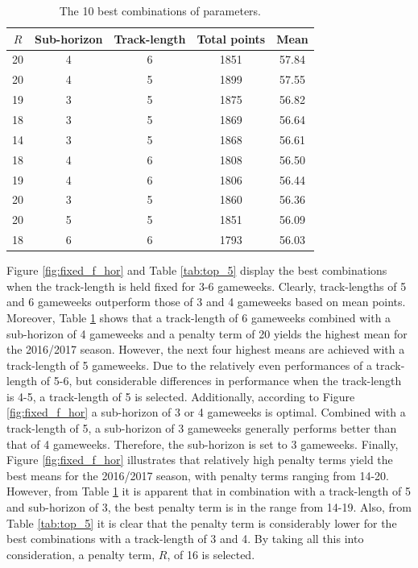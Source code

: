 \begin{table}[H]
\centering
\begin{tabular}{|c|c|c|c|c|}
\hline
$R$ & Sub-horizon & Track-length & Total points & Mean  \\
\hline
20      & 4       & 6                & 1851         & 57.84 \\
20      & 4       & 5                & 1899         & 57.55 \\
19      & 3       & 5                & 1875         & 56.82 \\
18      & 3       & 5                & 1869         & 56.64 \\
14      & 3       & 5                & 1868         & 56.61 \\
18      & 4       & 6                & 1808         & 56.50 \\
19      & 4       & 6                & 1806         & 56.44 \\
20      & 3       & 5                & 1860         & 56.36 \\
20      & 5       & 5                & 1851         & 56.09 \\
18      & 6       & 6                & 1793         & 56.03 \\
\hline
\end{tabular}
\caption{The 10 best combinations of parameters.}
\label{tab:top_10}
\end{table}


Figure \ref{fig:fixed_f_hor} and Table \ref{tab:top_5} display the best combinations when the track-length is held fixed for 3-6 gameweeks. Clearly, track-lengths of 5 and 6 gameweeks outperform those of 3 and 4 gameweeks based on mean points. Moreover, Table \ref{tab:top_10} shows that a track-length of 6 gameweeks combined with a sub-horizon of 4 gameweeks and a penalty term of 20 yields the highest mean for the 2016/2017 season. However, the next four highest means are achieved with a track-length of 5 gameweeks. Due to the relatively even performances of a track-length of 5-6, but considerable differences in performance when the track-length is 4-5, a track-length of 5 is selected. Additionally, according to Figure \ref{fig:fixed_f_hor} a sub-horizon of 3 or 4 gameweeks is optimal. Combined with a track-length of 5, a sub-horizon of 3 gameweeks generally performs better than that of 4 gameweeks. Therefore, the sub-horizon is set to 3 gameweeks. Finally, Figure \ref{fig:fixed_f_hor} illustrates that relatively high penalty terms yield the best means for the 2016/2017 season, with penalty terms ranging from 14-20. However, from Table \ref{tab:top_10} it is apparent that in combination with a track-length of 5 and sub-horizon of 3, the best penalty term is in the range from 14-19. Also, from Table \ref{tab:top_5} it is clear that the penalty term is considerably lower for the best combinations with a track-length of 3 and 4. By taking all this into consideration, a penalty term, $R$, of 16 is selected.


